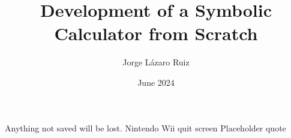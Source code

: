 \documentclass[en]{uc3mthesisIEEE}
\title{Development of a Symbolic Calculator from Scratch}
\author{Jorge Lázaro Ruiz}
\date{June 2024}
\begin{document}
  \makecover

  \makeepigraph
    {Anything not saved will be lost.}  %
    {Nintendo Wii quit screen}  %
    {Placeholder quote}  %


  \begin{abstract}
    \lipsum[1-3]
  \end{abstract}


  \begin{acknowledgements}
  \end{acknowledgements}


  \tableofcontents
  \listoffigures
  \listoftables
  \lstlistoflistings


  \begin{thesis}
  \end{thesis}

  \cleardoublepage
  \label{bibliography}
  \printbibliography[heading=bibintoc]

  \cleardoublepage
  \label{glossary}
	\printglossaries


\end{document}

